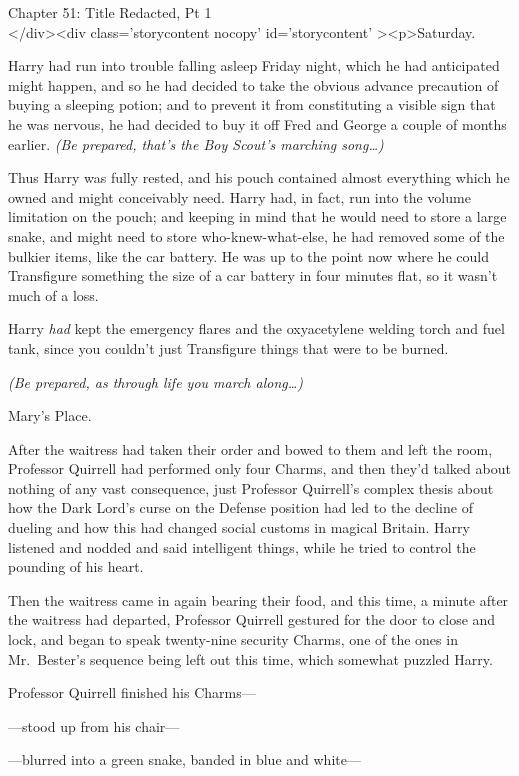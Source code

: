 
Chapter 51: Title Redacted, Pt 1\\
</div><div  class='storycontent nocopy' id='storycontent' ><p>Saturday.

Harry had run into trouble falling asleep Friday night, which he had 
anticipated might happen, and so he had decided to take the obvious advance 
precaution of buying a sleeping potion; and to prevent it from constituting a 
visible sign that he was nervous, he had decided to buy it off Fred and George 
a couple of months earlier. \emph{(Be prepared, that's the Boy Scout's marching 
song{\ldots})}

Thus Harry was fully rested, and his pouch contained almost everything which he 
owned and might conceivably need. Harry had, in fact, run into the volume 
limitation on the pouch; and keeping in mind that he would need to store a 
large snake, and might need to store who-knew-what-else, he had removed some of 
the bulkier items, like the car battery. He was up to the point now where he 
could Transfigure something the size of a car battery in four minutes flat, so 
it wasn't much of a loss.

Harry \emph{had} kept the emergency flares and the oxyacetylene welding torch 
and fuel tank, since you couldn't just Transfigure things that were to be 
burned.

\emph{(Be prepared, as through life you march along{\ldots})}

Mary's Place.

After the waitress had taken their order and bowed to them and left the room, 
Professor Quirrell had performed only four Charms, and then they'd talked about 
nothing of any vast consequence, just Professor Quirrell's complex thesis about 
how the Dark Lord's curse on the Defense position had led to the decline of 
dueling and how this had changed social customs in magical Britain. Harry 
listened and nodded and said intelligent things, while he tried to control the 
pounding of his heart.

Then the waitress came in again bearing their food, and this time, a minute 
after the waitress had departed, Professor Quirrell gestured for the door to 
close and lock, and began to speak twenty-nine security Charms, one of the ones 
in Mr.~Bester's sequence being left out this time, which somewhat puzzled Harry.

Professor Quirrell finished his Charms---

---stood up from his chair---

---blurred into a green snake, banded in blue and white---

